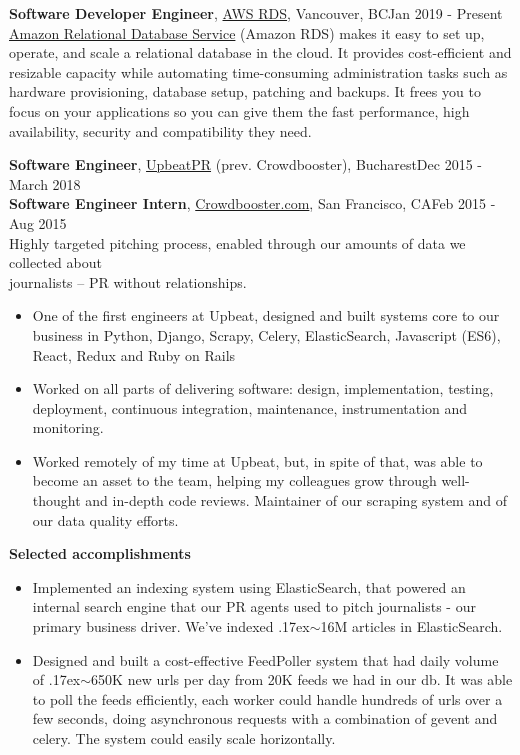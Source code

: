 \documentclass[line, margin]{resume}
\newcommand{\bettertilde}{\raise.17ex\hbox{$\scriptstyle\mathtt{\sim}$}}
\begin{document}
\begin{resume}
\textbf{Software Developer Engineer}, \href{https://aws.amazon.com/}{AWS RDS}, Vancouver, BC\hfill Jan 2019 - Present\\
\href{https://aws.amazon.com/rds/}{Amazon Relational Database Service} (Amazon RDS) makes it easy to set up, operate, and scale a relational database in the cloud. It provides cost-efficient and resizable capacity while automating time-consuming administration tasks such as hardware provisioning, database setup, patching and backups. It frees you to focus on your applications so you can give them the fast performance, high availability, security and compatibility they need.

\textbf{Software Engineer}, \href{http://upbeatpr.com}{UpbeatPR} (prev. Crowdbooster), Bucharest\hfill Dec 2015 - March 2018\\
\textbf{Software Engineer Intern}, \href{http://crowdbooster.com/}{Crowdbooster.com}, San Francisco, CA\hfill Feb 2015 - Aug 2015\\
Highly targeted pitching process, enabled through our amounts of data we collected about\\ journalists -- PR without relationships.
\begin{itemize} \itemsep -2pt  %
	\item One of the first engineers at Upbeat, designed and built systems core to our business in Python, Django, Scrapy, Celery, ElasticSearch, Javascript (ES6), React, Redux and Ruby on Rails
    \item Worked on all parts of delivering software: design, implementation, testing, deployment, continuous integration, maintenance, instrumentation and monitoring.
	\item Worked remotely  of my time at Upbeat, but, in spite of that, was able to become an asset to the team, helping my colleagues grow through well-thought and in-depth code reviews. Maintainer of our scraping system and of our data quality efforts.
\end{itemize}\vspace{-2.5mm}
\textbf{Selected accomplishments}
\begin{itemize} \itemsep -2pt  %
	\item Implemented an indexing system using ElasticSearch, that powered an internal search engine that our PR agents used to pitch journalists - our primary business driver. We've indexed \bettertilde16M articles in ElasticSearch.
	\item Designed and built a cost-effective FeedPoller system that had daily volume of \bettertilde650K new urls per day from 20K feeds we had in our db. It was able to poll the feeds efficiently, each worker could handle hundreds of urls over a few seconds, doing asynchronous requests with a combination of gevent and celery. The system could easily scale horizontally.
\end{itemize}


\end{resume}
\end{document}

